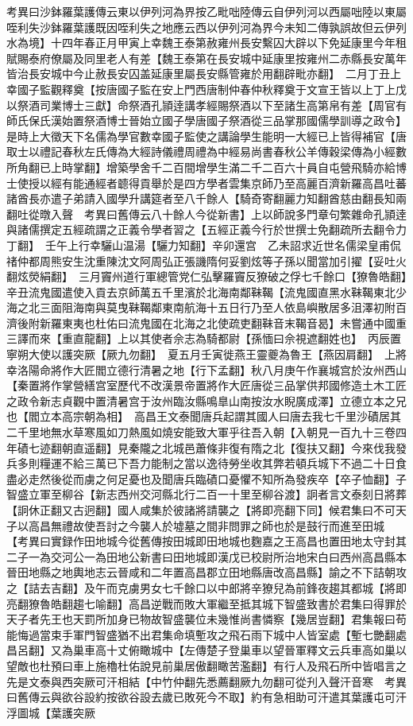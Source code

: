 考異曰沙鉢羅葉護傳云東以伊列河為界按乙毗咄陸傳云自伊列河以西屬咄陸以東屬咥利失沙鉢羅葉護既因咥利失之地應云西以伊列河為界今未知二傳孰誤故但云伊列水為境】十四年春正月甲寅上幸魏王泰第赦雍州長安繫囚大辟以下免延康里今年租賦賜泰府僚屬及同里老人有差【魏王泰第在長安城中延康里按雍州二赤縣長安萬年皆治長安城中今止赦長安囚盖延康里屬長安縣管雍於用翻辟毗亦翻】　二月丁丑上幸國子監觀釋奠【按唐國子監在安上門西唐制仲春仲秋釋奠于文宣王皆以上丁上戊以祭酒司業博士三獻】命祭酒孔頴逹講孝經賜祭酒以下至諸生高第帛有差【周官有師氏保氏漢始置祭酒博士晉始立國子學唐國子祭酒從三品掌那國儒學訓導之政令】是時上大徵天下名儒為學官數幸國子監使之講論學生能明一大經已上皆得補官【唐取士以禮記春秋左氏傳為大經詩儀禮周禮為中經易尚書春秋公羊傳穀梁傳為小經數所角翻已上時掌翻】增築學舍千二百間增學生滿二千二百六十員自屯營飛騎亦給博士使授以經有能通經者聼得貢舉於是四方學者雲集京師乃至高麗百濟新羅高昌吐蕃諸酋長亦遣子弟請入國學升講筵者至八千餘人【騎奇寄翻麗力知翻酋慈由翻長知兩翻吐從暾入聲　考異曰舊傳云八十餘人今從新書】上以師說多門章句繁雜命孔頴逹與諸儒撰定五經疏謂之正義令學者習之【五經正義今行於世撰士免翻疏所去翻令力丁翻】　壬午上行幸驪山温湯【驪力知翻】辛卯還宫　乙未詔求近世名儒梁皇甫侃禇仲都周熊安生沈重陳沈文阿周弘正張譏隋何妥劉炫等子孫以聞當加引擢【妥吐火翻炫熒絹翻】　三月竇州道行軍總管党仁弘擊羅竇反獠破之俘七千餘口【獠魯皓翻】　辛丑流鬼國遣使入貢去京師萬五千里濱於北海南鄰靺鞨【流鬼國直黑水靺鞨東北少海之北三面阻海南與莫曳靺鞨鄰東南航海十五日行乃至人依島嶼散居多沮澤初附百濟後附新羅東夷也杜佑曰流鬼國在北海之北使疏吏翻靺音末鞨音曷】未嘗通中國重三譯而來【重直龍翻】上以其使者佘志為騎都尉【孫愐曰佘視遮翻姓也】　丙辰置寧朔大使以護突厥【厥九勿翻】　夏五月壬寅徙燕王靈夔為魯王【燕因肩翻】　上將幸洛陽命將作大匠閻立德行清暑之地【行下孟翻】秋八月庚午作襄城宫於汝州西山【秦置將作掌營繕宫室歷代不改漢景帝置將作大匠唐從三品掌供邦國修造土木工匠之政令新志貞觀中置清暑宫于汝州臨汝縣鳴臯山南按汝水睨廣成澤】立德立本之兄也【閻立本高宗朝為相】　高昌王文泰聞唐兵起謂其國人曰唐去我七千里沙磧居其二千里地無水草寒風如刀熱風如燒安能致大軍乎往吾入朝【入朝見一百九十三卷四年磧七迹翻朝直遥翻】見秦隴之北城邑蕭條非復有隋之北【復扶又翻】今來伐我發兵多則糧運不給三萬已下吾力能制之當以逸待勞坐收其弊若頓兵城下不過二十日食盡必走然後從而虜之何足憂也及聞唐兵臨磧口憂懼不知所為發疾卒【卒子恤翻】子智盛立軍至柳谷【新志西州交河縣北行二百一十里至柳谷渡】詗者言文泰刻日將葬【詗休正翻又古迥翻】國人咸集於彼諸將請襲之【將即亮翻下同】候君集曰不可天子以高昌無禮故使吾討之今襲人於墟墓之間非問罪之師也於是鼓行而進至田城　【考異曰實録作田地城今從舊傳按田城即田地城也麴嘉之王高昌也置田地太守封其二子一為交河公一為田地公新書曰田地城即漢戊已校尉所治地宋白曰西州高昌縣本晉田地縣之地輿地志云晉咸和二年置高昌郡立田地縣唐改高昌縣】諭之不下詰朝攻之【詰去吉翻】及午而克虜男女七千餘口以中郎將辛獠兒為前鋒夜趨其都城【將即亮翻獠魯皓翻趨七喻翻】高昌逆戰而敗大軍繼至抵其城下智盛致書於君集曰得罪於天子者先王也天罰所加身已物故智盛襲位未幾惟尚書憐察【幾居豈翻】君集報曰苟能悔過當束手軍門智盛猶不出君集命填塹攻之飛石雨下城中人皆室處【塹七艷翻處昌呂翻】又為巢車高十丈俯瞰城中【左傳楚子登巢車以望晉軍釋文云兵車高如巢以望敵也杜預曰車上施櫓杜佑說見前巢居傲翻瞰苦濫翻】有行人及飛石所中皆唱言之先是文泰與西突厥可汗相結【中竹仲翻先悉薦翻厥九勿翻可從刋入聲汗音寒　考異曰舊傳云與欲谷設約按欲谷設去歲已敗死今不取】約有急相助可汗遣其葉護屯可汗浮圖城【葉護突厥